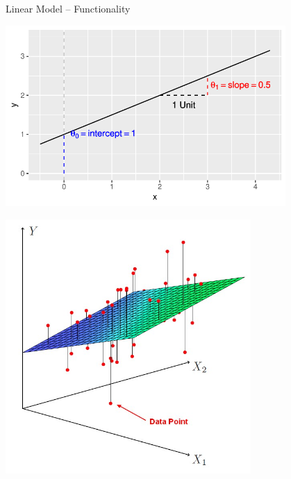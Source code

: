 \documentclass[11pt,compress,t,notes=noshow, xcolor=table]{beamer}
\begin{document}
\begin{frame}{Linear Model -- Functionality}
\medskip
\footnotesize
\begin{minipage}{0.45\textwidth}
  \includegraphics[width=0.8\textwidth]{figure/reg_lm_plot.pdf}
\end{minipage}
 \normalsize 
\begin{minipage}{0.45\textwidth}
  \includegraphics[width=0.7\textwidth]{figure/regression_hyperplane.jpg}
\end{minipage}

\end{frame}

\end{document}
